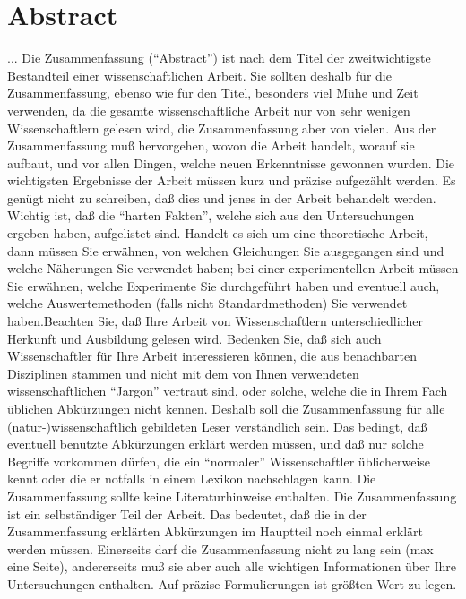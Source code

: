 \chapter*{Abstract}
... Die Zusammenfassung ("`Abstract"') ist nach dem Titel der zweitwichtigste Bestandteil einer
wissenschaftlichen Arbeit. Sie sollten deshalb für die Zusammenfassung, ebenso wie für den
Titel, besonders viel Mühe und Zeit verwenden, da die gesamte wissenschaftliche Arbeit nur
von sehr wenigen Wissenschaftlern gelesen wird, die Zusammenfassung aber von vielen. Aus
der Zusammenfassung muß hervorgehen, wovon die Arbeit handelt, worauf sie aufbaut, und
vor allen Dingen, welche neuen Erkenntnisse gewonnen wurden. Die wichtigsten Ergebnisse
der Arbeit müssen kurz und präzise aufgezählt werden. Es genügt nicht zu schreiben, daß dies
und jenes in der Arbeit behandelt werden. Wichtig ist, daß die "`harten Fakten"', welche sich
aus den Untersuchungen ergeben haben, aufgelistet sind.
Handelt es sich um eine theoretische Arbeit, dann müssen Sie erwähnen, von welchen
Gleichungen Sie ausgegangen sind und welche Näherungen Sie verwendet haben; bei einer
experimentellen Arbeit müssen Sie erwähnen, welche Experimente Sie durchgeführt haben
und eventuell auch, welche Auswertemethoden (falls nicht Standardmethoden) Sie verwendet
haben.Beachten Sie, daß Ihre Arbeit von Wissenschaftlern unterschiedlicher Herkunft und
Ausbildung gelesen wird. Bedenken Sie, daß sich auch Wissenschaftler für Ihre Arbeit
interessieren können, die aus benachbarten Disziplinen stammen und nicht mit dem von Ihnen
verwendeten wissenschaftlichen "`Jargon"' vertraut sind, oder solche, welche die in Ihrem Fach
üblichen Abkürzungen nicht kennen. Deshalb soll die Zusammenfassung für alle
(natur-)wissenschaftlich gebildeten Leser verständlich sein. Das bedingt, daß eventuell
benutzte Abkürzungen erklärt werden müssen, und daß nur solche Begriffe vorkommen
dürfen, die ein "`normaler"' Wissenschaftler üblicherweise kennt oder die er notfalls in einem
Lexikon nachschlagen kann. 
Die Zusammenfassung sollte keine Literaturhinweise enthalten. Die Zusammenfassung ist ein
selbständiger Teil der Arbeit. Das bedeutet, daß die in der Zusammenfassung erklärten
Abkürzungen im Hauptteil noch einmal erklärt werden müssen.
Einerseits darf die Zusammenfassung nicht zu lang sein (max eine Seite), andererseits muß sie aber auch alle wichtigen
Informationen über Ihre Untersuchungen enthalten. Auf präzise Formulierungen ist größten
Wert zu legen. 
